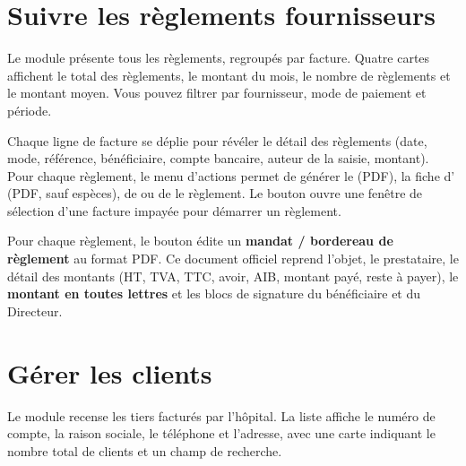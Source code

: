 

\section{Suivre les règlements fournisseurs}

Le module  présente tous les règlements, regroupés par facture. Quatre cartes affichent le total des règlements, le montant du mois, le nombre de règlements et le montant moyen. Vous pouvez filtrer par fournisseur, mode de paiement et période.

Chaque ligne de facture se déplie pour révéler le détail des règlements (date, mode, référence, bénéficiaire, compte bancaire, auteur de la saisie, montant). Pour chaque règlement, le menu d'actions permet de générer le  (PDF), la fiche d' (PDF, sauf espèces), de  ou de  le règlement. Le bouton  ouvre une fenêtre de sélection d'une facture impayée pour démarrer un règlement.


Pour chaque règlement, le bouton  édite un \textbf{mandat / bordereau de règlement} au format PDF. Ce document officiel reprend l'objet, le prestataire, le détail des montants (HT, TVA, TTC, avoir, AIB, montant payé, reste à payer), le \textbf{montant en toutes lettres} et les blocs de signature du bénéficiaire et du Directeur.

\section{Gérer les clients}

Le module  recense les tiers facturés par l'hôpital. La liste affiche le numéro de compte, la raison sociale, le téléphone et l'adresse, avec une carte indiquant le nombre total de clients et un champ de recherche.

